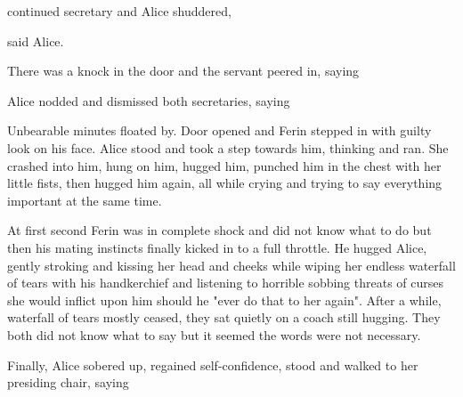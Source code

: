 

 continued secretary and Alice shuddered, 



 said Alice.



There was a knock in the door and the servant peered in, saying 

Alice nodded and dismissed both secretaries, saying 

Unbearable minutes floated by. Door opened and Ferin stepped in with guilty look on his face. Alice stood and took a step towards him, thinking  and ran. She crashed into him, hung on him, hugged him, punched him in the chest with her little fists, then hugged him again, all while crying and trying to say everything important at the same time.

At first second Ferin was in complete shock and did not know what to do but then his mating instincts finally kicked in to a full throttle. He hugged Alice, gently stroking and kissing her head and cheeks while wiping her endless waterfall of tears with his handkerchief and listening to horrible sobbing threats of curses she would inflict upon him should he "ever do that to her again". After a while, waterfall of tears mostly ceased, they sat quietly on a coach still hugging. They both did not know what to say but it seemed the words were not necessary.

Finally, Alice sobered up, regained self-confidence, stood and walked to her presiding chair, saying 

